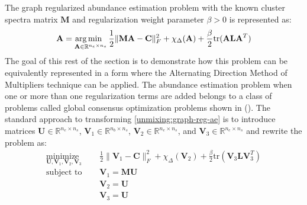The graph regularized abundance estimation problem with the known cluster spectra matrix $\mathbf{M}$ and regularization weight parameter $\beta > 0$ is represented as:
\begin{equation}
    \label{unmixing:graph-reg-ae}
    \mathbf{A} = \operatorname*{arg\,min \;\;}_{\mathbf{A} \in \mathbb{R}^{n_e \times n_s}} \frac{1}{2}\|\mathbf{MA} - \mathbf{C}\|_F^2 + \chi_\Delta(\mathbf{A}) + \frac{\beta}{2}\text{tr}(\mathbf{ALA}^T) 
\end{equation}
The goal of this rest of the section is to demonstrate how this problem can be equivalently represented in a form where the Alternating Direction Method of Multipliers technique can be applied. The abundance estimation problem when one or more than one regularization terms are added belongs to a class of problems called global consensus optimization problems shown in (\cite{ADMM}). The standard approach to transforming \eqref{unmixing:graph-reg-ae} is to introduce matrices $\mathbf{U} \in \mathbb{R}^{n_e \times n_s}$, $\mathbf{V}_1 \in \mathbb{R}^{n_b \times n_s}$, $\mathbf{V}_2 \in \mathbb{R}^{n_e \times n_s}$, and $\mathbf{V}_{3} \in \mathbb{R}^{n_e \times n_s}$ and rewrite the problem as:
\begin{equation}
    \label{unmixing:graph-reg-ae-admm-1}
    \begin{aligned}
        \underset{\mathbf{U}, \mathbf{V}_1, \mathbf{V}_2, \mathbf{V}_3}{\text{minimize }} & \quad \frac{1}{2} \|\mathbf{V}_1 - \mathbf{C} \|_F^2 + \chi_{\Delta}(\mathbf{V}_2) + \frac{\beta}{2}\text{tr}(\mathbf{V}_3 \mathbf{L} \mathbf{V}_3^T) 
        \\         
        \text{subject to } &  \quad \mathbf{V}_1 = \mathbf{MU} \\
        & \quad \mathbf{V}_2 = \mathbf{U} \\
        & \quad \mathbf{V}_{3} = \mathbf{U}
   \end{aligned}
\end{equation}

